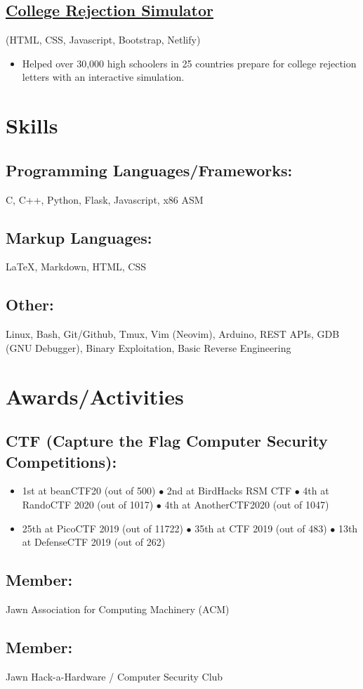 \documentclass{article}
\begin{document}
\subsection{\href{https://youtu.be/DLzxrzFCyOs}{\underline{College Rejection Simulator}}} \hfill (HTML, CSS, Javascript, Bootstrap, Netlify)
\begin{itemize}
    \item Helped over 30,000 high schoolers in 25 countries prepare for college rejection letters with an interactive simulation.
\end{itemize}

\section{Skills}
\subsection{Programming Languages/Frameworks:}
C, C++, Python, Flask, Javascript, x86 ASM
\subsection{Markup Languages:}
{\LaTeX}, Markdown, HTML, CSS
\subsection{Other:}
Linux, Bash, Git/Github, Tmux, Vim (Neovim), Arduino, REST APIs, GDB (GNU Debugger), Binary Exploitation, Basic Reverse Engineering

\section{Awards/Activities}
\subsection{CTF (Capture the Flag Computer Security Competitions):}
\begin{itemize}
    \item 1st at beanCTF20 (out of 500) $\bullet$ 2nd at BirdHacks RSM CTF $\bullet$ 4th at RandoCTF 2020 (out of 1017) $\bullet$ 4th at AnotherCTF2020 (out of 1047)
    \item 25th at PicoCTF 2019 (out of 11722) $\bullet$ 35th at CTF 2019 (out of 483) $\bullet$ 13th at DefenseCTF 2019 (out of 262)
\end{itemize} 
\subsection{Member: } Jawn Association for Computing Machinery (ACM)
\subsection{Member: } Jawn Hack-a-Hardware / Computer Security Club 
\end{document}
